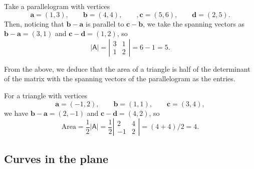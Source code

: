 \documentclass[10pt,notitlepage]{revtex4-1}
\newenvironment{example}[1][Example]{\begin{trivlist}
\item[\hskip \labelsep {\bfseries #1}]}{\end{trivlist}}
\newcommand{\ab}{{\boldsymbol{a}}}
\newcommand{\bb}{{\boldsymbol{b}}}
\newcommand{\cb}{{\boldsymbol{c}}}
\newcommand{\db}{{\boldsymbol{d}}}
\begin{document}
\begin{example}
	Take a parallelogram with vertices
	\begin{equation}
		\ab=(1,3),\qquad\bb=(4,4),\qquad,\cb=(5,6),\qquad\db=(2,5).
	\end{equation}
	Then, noticing that $\bb-\ab$ is parallel to $\cb-\bb$, we take the spanning
	vectors as $\bb-\ab=(3,1)$ and $\cb-\db=(1,2)$, so
	\begin{equation}
		|\mathsf{A}|=\left|\begin{matrix}3 & 1\\ 1 & 2\end{matrix}\right|=6-1=5.
	\end{equation}
\end{example}

From the above, we deduce that the area of a triangle is half of the
determinant of the matrix with the spanning vectors of the parallelogram as the
entries.

\begin{example}
	For a triangle with vertices
	\begin{equation}
		\ab=(-1,2),\qquad\bb=(1,1),\qquad\cb=(3,4),
	\end{equation}
	we have $\bb-\ab=(2,-1)$ and $\cb-\db=(4,2)$, so
	\begin{equation}
		\mbox{Area}=\frac{1}{2}|\mathsf{A}|
		=\frac{1}{2}\left|\begin{matrix}2 & 4\\ -1 & 2\end{matrix}\right|
		=(4+4)/2=4.
	\end{equation}
\end{example}


\subsection{Curves in the plane}
\end{document}
